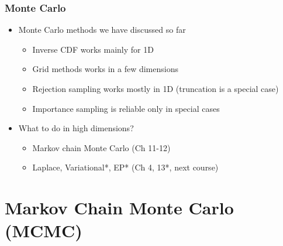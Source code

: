 \documentclass[10pt]{beamer}
\begin{document}
\begin{frame}

\frametitle{ Monte Carlo}

  \begin{itemize}
  \item Monte Carlo methods we have discussed so far
    \begin{itemize}
    \item Inverse CDF works mainly for 1D \pause
    \item Grid methods works in a few dimensions \pause
    \item Rejection sampling works mostly in 1D (truncation is a special case) \pause
    \item Importance sampling is reliable only in special cases
    \end{itemize}
    \pause
  \item What to do in high dimensions? \pause
    \begin{itemize}
    \item Markov chain Monte Carlo (Ch 11-12) \pause
    \item Laplace, Variational*, EP* (Ch 4, 13*, next course)
    \end{itemize}
  \end{itemize}
\end{frame}


\section{Markov Chain Monte Carlo (MCMC)}
\end{document}
